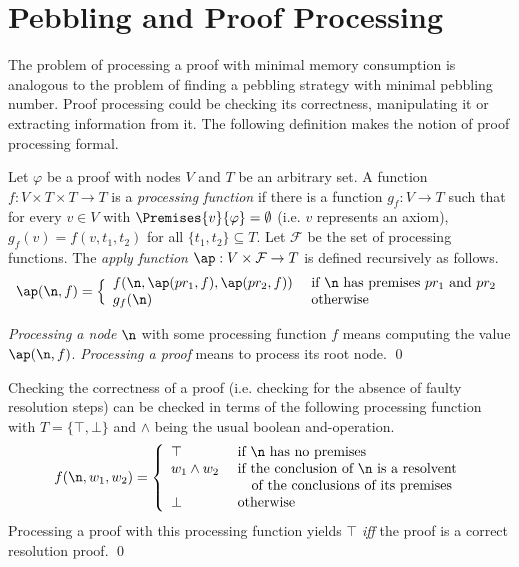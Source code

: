 \section{Pebbling and Proof Processing}
\label{sec:pebblingchecking}

The problem of processing a proof with minimal memory consumption is analogous to the problem of finding a pebbling strategy with minimal pebbling number.
Proof processing could be checking its correctness, manipulating it or extracting information from it.
The following definition makes the notion of proof processing formal.

\begin{definition}
\label{def:proof-processing}

Let $\varphi$ be a proof with nodes $V$ and $T$ be an arbitrary set.
A function $f: V \times T \times T \rightarrow T$ is a \emph{processing function} if there is a function $g_f: V \rightarrow T$ such that for every $v \in V$ with $\Premises{v}{\varphi} = \emptyset$ (i.e. $v$ represents an axiom), $g_f(v) = f(v,t_1,t_2)$ for all $\{t_1,t_2\} \subseteq T$.
Let $\mathcal{F}$ be the set of processing functions.
The \emph{apply function} $\ap: V \times \mathcal{F} \rightarrow T$ is defined recursively as follows.
$$
\ap(\n,f) = \Big\{
\begin{array}{ll}
	f(\n,\ap(pr_1,f),\ap(pr_2,f)) &\text{ if } \n \text{ has premises } pr_1 \text{ and } pr_2\\
	g_f(\n) &\text{ otherwise}\\
\end{array}
$$

\emph{Processing a node} $\n$ with some processing function $f$ means computing the value $\ap(\n,f)$.
\emph{Processing a proof} means to process its root node.
\qed
\end{definition}

\begin{example}

Checking the correctness of a proof (i.e. checking for the absence of faulty resolution steps) can be checked in terms of the following processing function with $T = \{\top,\bot\}$ and $\wedge$ being the usual boolean and-operation.
$$
f(\n,w_1,w_2) = \left\{
\begin{array}{ll}
	\top & \text{ if $\n$ has no premises} \\
	w_1 \wedge w_2 &\text{ if the conclusion of $\n$ is a resolvent}\\
								 &\quad \text{ of the conclusions of its premises} \\
	\bot & \text{ otherwise}
\end{array}
\right.
$$
Processing a proof with this processing function yields $\top$ \emph{iff} the proof is a correct resolution proof.
\qed
\end{example}

